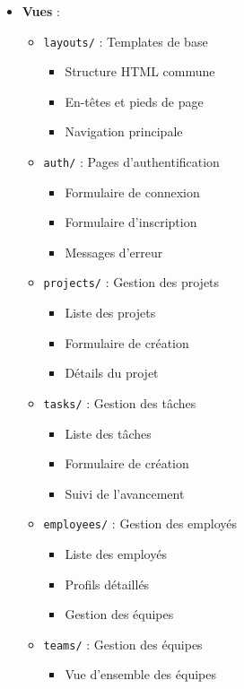 \documentclass[12pt,a4paper]{article}
\begin{document}
\begin{itemize}
    \item \textbf{Vues} :
    \begin{itemize}
        \item \texttt{layouts/} : Templates de base
        \begin{itemize}
            \item Structure HTML commune
            \item En-têtes et pieds de page
            \item Navigation principale
        \end{itemize}
        \item \texttt{auth/} : Pages d'authentification
        \begin{itemize}
            \item Formulaire de connexion
            \item Formulaire d'inscription
            \item Messages d'erreur
        \end{itemize}
        \item \texttt{projects/} : Gestion des projets
        \begin{itemize}
            \item Liste des projets
            \item Formulaire de création
            \item Détails du projet
        \end{itemize}
        \item \texttt{tasks/} : Gestion des tâches
        \begin{itemize}
            \item Liste des tâches
            \item Formulaire de création
            \item Suivi de l'avancement
        \end{itemize}
        \item \texttt{employees/} : Gestion des employés
        \begin{itemize}
            \item Liste des employés
            \item Profils détaillés
            \item Gestion des équipes
        \end{itemize}
        \item \texttt{teams/} : Gestion des équipes
        \begin{itemize}
            \item Vue d'ensemble des équipes

\end{itemize}
\end{itemize}
\end{itemize}
\end{document}
